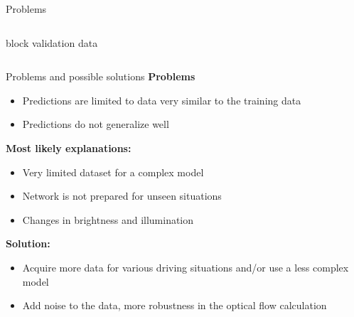 \begin{frame}{Problems}
\begin{columns}[c]
\begin{column}{0.5\textwidth}
\begin{center}
			block validation data
			\end{center}
		\end{column}
	\end{columns}
\end{frame}

\begin{frame}{Problems and possible solutions}
	\textbf{Problems}
	\begin{itemize}
		\item Predictions are limited to data very similar to the training data
		\item Predictions do not generalize well
	\end{itemize}
	\textbf{Most likely explanations:}
	\begin{itemize}
		\item Very limited dataset for a complex model
		\item Network is not prepared for unseen situations
		\item Changes in brightness and illumination
	\end{itemize}
	\textbf{Solution:}
	\begin{itemize}
		\item Acquire more data for various driving situations and/or use a less complex model
		\item Add noise to the data, more robustness in the optical flow calculation
	\end{itemize}
\end{frame}

%
%


